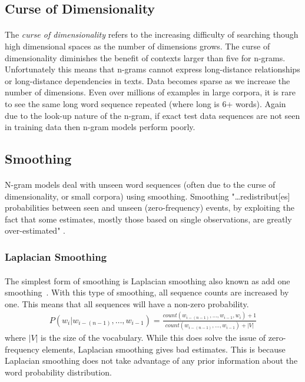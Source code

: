 \subsection{Curse of Dimensionality}
\paragraph{}
The \emph{curse of dimensionality} refers to the increasing difficulty of searching though high dimensional spaces as the number of dimensions grows. The curse of dimensionality diminishes the benefit of contexts larger than five for n-grams. Unfortunately this means that n-grams cannot express long-distance relationships or long-distance dependencies in texts. Data becomes sparse as we increase the number of dimensions. Even over millions of examples in large corpora, it is rare to see the same long word sequence repeated (where long is 6+ words). Again due to the look-up nature of the n-gram, if exact test data sequences are not seen in training data then n-gram models perform poorly.
\subsection{Smoothing}
\paragraph{}
N-gram models deal with unseen word sequences (often due to the curse of dimensionality, or small corpora) using smoothing. Smoothing "\dots redistribut[es] probabilities between seen and unseen (zero-frequency) events, by
exploiting the fact that some estimates, mostly those based on single observations, are greatly over-estimated" \cite[pg. 16]{Mikolov2012}.
\subsubsection{Laplacian Smoothing}
\paragraph{}
The simplest form of smoothing is Laplacian smoothing also known as add one smoothing~\cite{Jurafsky2009}. With this type of smoothing, all sequence counts are increased by one. This means that all sequences will have a non-zero probability. 
\begin{align}
P(w_i | w_{i-(n-1)},\dots, w_{i-1}) = \frac{count(w_{i-(n-1)},\dots,w_{i-1},w_i)+1}{count(w_{i-(n-1)},\dots,w_{i-1})+|V|}
\end{align}
where $|V|$ is the size of the vocabulary. While this does solve the issue of zero-frequency elements, Laplacian smoothing gives bad estimates. This is because Laplacian smoothing does not take advantage of any prior information about the word probability distribution.
